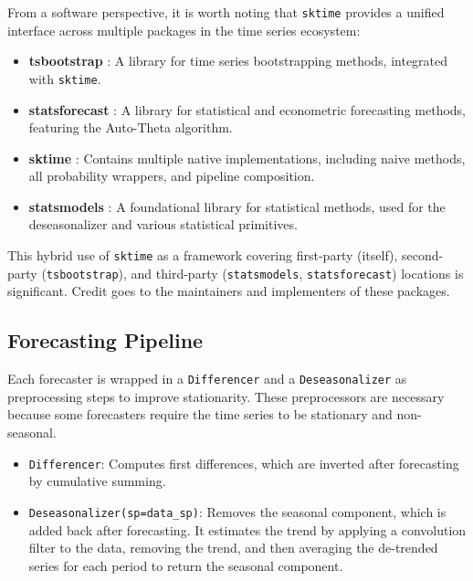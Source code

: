 From a software perspective, it is worth noting that \texttt{sktime} provides a unified interface across multiple packages in the time series ecosystem:

\begin{itemize}
    \item \textbf{tsbootstrap} \cite{gilda_2024_10866090_tsbootstrap, gilda2024tsbootstrap}: A library for time series bootstrapping methods, integrated with \texttt{sktime}.
    \item \textbf{statsforecast} \cite{garza2022statsforecast}: A library for statistical and econometric forecasting methods, featuring the Auto-Theta algorithm.
    \item \textbf{sktime} \cite{loning2019sktime, franz_kiraly_2024_11095261_sktime}: Contains multiple native implementations, including naive methods, all probability wrappers, and pipeline composition.
    \item \textbf{statsmodels} \cite{seabold2010statsmodels}: A foundational library for statistical methods, used for the deseasonalizer and various statistical primitives.
\end{itemize}

This hybrid use of \texttt{sktime} as a framework covering first-party (itself), second-party (\texttt{tsbootstrap}), and third-party (\texttt{statsmodels}, \texttt{statsforecast}) locations is significant. Credit goes to the maintainers and implementers of these packages.

\subsection{Forecasting Pipeline}
Each forecaster is wrapped in a \texttt{Differencer} and a \texttt{Deseasonalizer} as preprocessing steps to improve stationarity. These preprocessors are necessary because some forecasters require the time series to be stationary and non-seasonal.

\begin{itemize}
    \item \texttt{Differencer}: Computes first differences, which are inverted after forecasting by cumulative summing.
    \item \texttt{Deseasonalizer(sp=data\_sp)}: Removes the seasonal component, which is added back after forecasting. It estimates the trend by applying a convolution filter to the data, removing the trend, and then averaging the de-trended series for each period to return the seasonal component.
\end{itemize}

